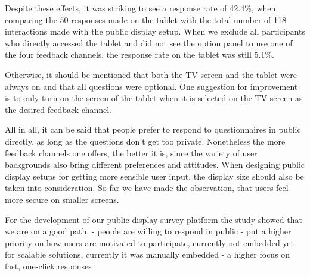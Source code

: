 	Despite these effects, it was striking to see a response rate of 42.4\%, when comparing the 50 responses made on the tablet with the total number of 118 interactions made with the public display setup. When we exclude all participants who directly accessed the tablet and did not see the option panel to use one of the four feedback channels, the response rate on the tablet was still 5.1\%. 

	Otherwise, it should be mentioned that both the TV screen and the tablet were always on and that all questions were optional. One suggestion for improvement is to only turn on the screen of the tablet when it is selected on the TV screen as the desired feedback channel.



	All in all, it can be said that people prefer to respond to questionnaires in public directly, as long as the questions don't get too private. Nonetheless the more feedback channels one offers, the better it is, since the variety of user backgrounds also bring different preferences and attitudes. When designing public display setups for getting more sensible user input, the display size should also be taken into consideration. So far we have made the observation, that users feel more secure on smaller screens.	


	For the development of our public display survey platform the study showed that we are on a good path. 
		- people are willing to respond in public
		- put a higher priority on how users are motivated to participate, currently not embedded yet for scalable solutions, currently it was manually embedded
		- a higher focus on fast, one-click responses







